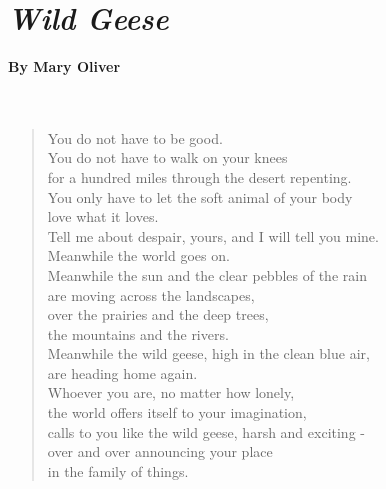 \documentclass[12pt, openany, letterpaper]{memoir}
\begin{document}
\newpage
\pagestyle{empty}
\addtocounter{page}{-1}
\section*{\emph{Wild Geese}}
\paragraph{By Mary Oliver}~
\begin{verse}
	You do not have to be good.\\
	You do not have to walk on your knees\\
	for a hundred miles through the desert repenting.\\
	You only have to let the soft animal of your body\\
	love what it loves.\\
	Tell me about despair, yours, and I will tell you mine.\\
	Meanwhile the world goes on.\\
	Meanwhile the sun and the clear pebbles of the rain\\
	are moving across the landscapes,\\
	over the prairies and the deep trees,\\
	the mountains and the rivers.\\
	Meanwhile the wild geese, high in the clean blue air,\\
	are heading home again.\\
	Whoever you are, no matter how lonely,\\
	the world offers itself to your imagination,\\
	calls to you like the wild geese, harsh and exciting -\\
	over and over announcing your place\\
	in the family of things.
\end{verse}
\end{document}
